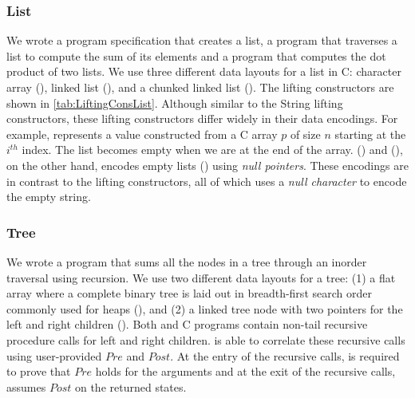 \subsubsection{List} We wrote a \SpecL{} program specification that creates a list, a
program that traverses a list to compute the sum of its elements and a program
that computes the dot product of two lists. We use three different
data layouts for a list in C: character array (),
linked list (), and
a chunked linked list ().
The lifting constructors are shown in \cref{tab:LiftingConsList}.
Although similar to the String lifting constructors, these lifting
constructors differ widely in their data encodings. For example,
 represents a  value constructed
from a C array $p$ of size $n$ starting at the $i^{th}$ index. The list becomes empty
when we are at the end of the array. ()
and (), on the other hand, encodes empty
lists () using {\em null pointers}. These encodings are in contrast to the
 lifting constructors, all of which uses a {\em null character} to
encode the empty string.


\vspace{-10px}
\subsubsection{Tree} We wrote a \SpecL{} program that sums all the nodes in a tree
through an inorder traversal using recursion. We use two different data layouts for a tree: 
(1) a flat array where a
complete binary tree is laid out in breadth-first search order commonly used for heaps (),
and (2) a linked tree node with two pointers for the left and right children ().
Both \SpecL{} and C programs contain non-tail recursive procedure calls for left and right children.
\toolName{} is able to correlate these recursive calls using user-provided $Pre$ and $Post$.
At the entry of the recursive calls, \toolName{} is required to prove that $Pre$ holds for the arguments
and at the exit of the recursive calls, \toolName{} assumes $Post$ on the returned states.


\vspace{-10px}
